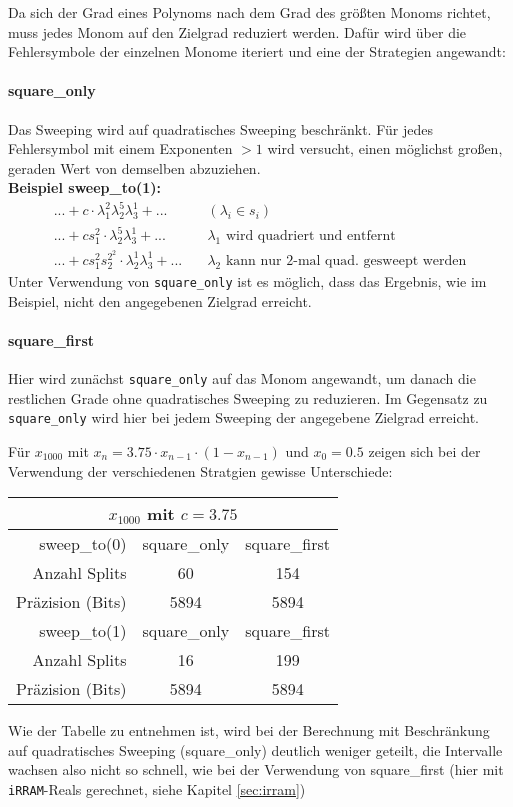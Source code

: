 Da sich der Grad eines Polynoms nach dem Grad des größten Monoms richtet, muss jedes Monom auf den Zielgrad reduziert werden. Dafür wird über die Fehlersymbole der einzelnen Monome iteriert und eine der Strategien angewandt:

\paragraph{square\_only}
Das Sweeping wird auf quadratisches Sweeping beschränkt. Für jedes Fehlersymbol mit einem Exponenten $> 1$ wird versucht, einen möglichst großen, geraden Wert von demselben abzuziehen. \\
\textbf{Beispiel sweep\_to(1):}
\begin{align*}
   ...+ c \cdot \lambda_1^2 \lambda_2^5 \lambda_3^1 +... & \quad (\lambda_i \in s_i) \\
    ...+ cs_1^2 \cdot \lambda_2^5 \lambda_3^1 +... & \quad \lambda_1 \text{ wird quadriert und entfernt} \\
    ...+ cs_1^2s_2^{2^2} \cdot \lambda_2^1 \lambda_3^1 +... & \quad \lambda_2 \text{ kann nur 2-mal quad. gesweept werden}
\end{align*}
Unter Verwendung von \verb+square_only+ ist es möglich, dass das Ergebnis, wie im Beispiel, nicht den angegebenen Zielgrad erreicht. 


\paragraph{square\_first}
Hier wird zunächst \verb+square_only+ auf das Monom angewandt, um danach die restlichen Grade ohne quadratisches Sweeping zu reduzieren. Im Gegensatz zu \verb+square_only+ wird hier bei jedem Sweeping der angegebene Zielgrad erreicht.

Für $x_{1000}$ mit $x_n = 3.75 \cdot x_{n-1} \cdot (1-x_{n-1})$ und $x_0 = 0.5$ zeigen sich bei der Verwendung der verschiedenen Stratgien gewisse Unterschiede:


\begin{center}
\begin{tabular}{|r|c|c|}
\hline
\multicolumn{3}{|c|}{$x_{1000}$ mit $c=3.75$}\\
\hline
  sweep\_to(0) &square\_only& square\_first \\
 \hline
 Anzahl Splits & 60 & 154 \\
 Präzision (Bits) & 5894 & 5894\\
 \hline
 \hline
   sweep\_to(1) &square\_only& square\_first \\
 \hline
 Anzahl Splits & 16 & 199 \\
 Präzision (Bits) & 5894 & 5894\\
 \hline
\end{tabular}
\end{center}

Wie der Tabelle zu entnehmen ist, wird bei der Berechnung mit Beschränkung auf quadratisches Sweeping (square\_only) deutlich weniger geteilt, die Intervalle wachsen also nicht so schnell, wie bei der Verwendung von square\_first (hier mit \verb+iRRAM+-Reals gerechnet, siehe Kapitel \ref{sec:irram})


% 
% 
